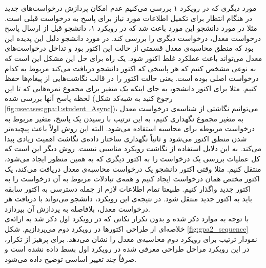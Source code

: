 مورد دیگری که در رویکرد ۱ بررسی می‌کنیم عدم امکان پردازش درخواست‌های جدید در هنگام انتظار برای تکمیل اطلاعات مورد نیاز برای پاسخ به درخواست قبلی است. مثلا در مورد دانشجو این مورد باعث شد که در رویکرد ۱، دانشجو قبل از ارسال پاسخ درخواست معدل،‌ درخواست دیگری را بررسی کند. در مورد دانشجو دلیل این پدیده این بود که منطق محاسبه‌ی معدل قسمتی از حالت این اکتور بود و تداخل درخواست‌های معدل می‌تواند باعث عملکرد غلط اکتور شود. یک راه برای حل این مشکل این است که به نوعی مشخص کنیم که هر پاسخی که اکتور دانشجو دریافت می‌کند مربوط به کدام درخواست اصلی بوده‌ است. یعنی حالت اکتور را در قالب نگاشت‌هایی از پیغام‌ها حفظ کنیم. مثلا برای اکتور دانشجو، به جای اینکه یک متغیر برای مجموع نمره‌هایی که تا این لحظه پاسخ آنها بررسی شده (رجوع کنید به شبه‌کد شکل \ref{fig:usecases:gpa:1:student_Async})، می‌توانیم نگاشتی از شناسه‌ی درخواست معدل به متغیر مجموع نگهداری کنیم، به این ترتیب با رسیدن یک پاسخ، متغیر مربوط به درخواست مربوطه برای محاسبه استفاده می‌شود. البته این روش اولاً باعث پیچیده‌تر شدن منطق اکتور می‌شود و ثانیاً نگهداری ساختار داده‌ی نگاشت اهمیت زیادی پیدا می‌کند. به این دلایل استفاده از نگاشت رویکرد مناسبی نیست. روش دیگر این است که کل عملیات بررسی یک درخواست را به اکتور دیگری که به همین منظور ایجاد می‌شود، منتقل کنیم. مثلا وقتی اکتور دانشجو یک درخواست محاسبه‌ی معدل دریافت می‌کند، یک اکتور مختص همان درخواست ایجاد کنیم و همه‌ی تبادلات مربوط به آن درخواست را به اکتور جدید واگذار کنیم. طبیعتا تمام اطلاعات لازم از جمله دسترسی به اکتور سابقه باید به اکتور جدید منتقل شود. در نتیجه‌ی این رویکرد، دانشجو می‌تواند با دریافت هر درخواست معدل، بلافاصله به پردازش آن بپردازد.\\
با توجه به موارد ذکر شده و بدون تکرار نکاتی که در رویکرد اول ذکر شد به ارائه‌ی خلاصه‌ای از طراحی اکتورها در رویکرد دوم می‌پردازیم.
شکل \ref{fig:gpa2_sequence} نمودار ترتیب برای رویکرد دوم محاسبه‌ی معدل را نشان ‌می‌دهد. برای پرهیز از تکرار، در این رویکرد مراحل طراحی معرفی شده در رویکرد اول بسط داده نشده است و صرفاً چند تغییر اساسی توضیح داده می‌شود.

